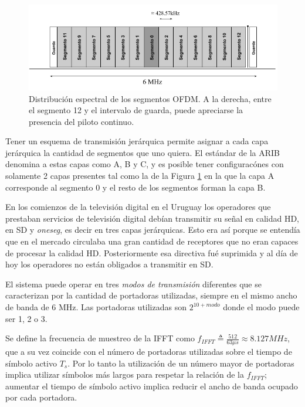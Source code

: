 \begin{figure}[h!]
	\centering
	\includegraphics[scale=0.55]{figuras/cap03/segmentos_isdbt}
	\caption{\label{segmentos_isdbt} Distribuci\'on espectral de los segmentos OFDM. A la derecha, entre el segmento 12 y el intervalo de guarda, puede apreciarse la presencia del piloto continuo.}
\end{figure}

Tener un esquema de transmisi\'on jer\'arquica permite asignar a cada capa jer\'arquica la cantidad de segmentos que uno quiera. El est\'andar de la ARIB denomina a estas capas como A, B y C, y es posible tener configurac\'ones con solamente 2 capas presentes tal como la de la Figura \ref{segmentos_isdbt} en la que la capa A corresponde al segmento 0 y el resto de los segmentos forman la capa B.

En los comienzos de la televisi\'on digital en el Uruguay los operadores que prestaban servicios de televisi\'on digital deb\'ian transmitir su señal en calidad HD, en SD y \textit{oneseg}, es decir en tres capas jer\'arquicas. Esto era as\'i porque se entend\'ia que en el mercado circulaba una gran cantidad de receptores que no eran capaces de procesar la calidad HD. Posteriormente esa directiva fu\'e suprimida y al d\'ia de hoy los operadores no est\'an obligados a transmitir en SD.



El sistema puede operar en tres \textit{modos de transmisi\'on} diferentes que se caracterizan por la cantidad de portadoras utilizadas, siempre en el mismo ancho de banda de 6 MHz. Las portadoras utilizadas son $2^{10+modo}$ donde el modo puede ser 1, 2 o 3.

Se define la frecuencia de muestreo de la IFFT como $f_{IFFT} \triangleq \frac{512}{63 \mu s} \approx 8.127 MHz$, que a su vez coincide con el n\'umero de portadoras utilizadas sobre el tiempo de s\'imbolo activo $T_s$. Por lo tanto la utilizaci\'on de un n\'umero mayor de portadoras implica utilizar s\'imbolos m\'as largos para respetar la relaci\'on de la $f_{IFFT}$; aumentar el tiempo de s\'imbolo activo implica reducir el ancho de banda ocupado por cada portadora.

